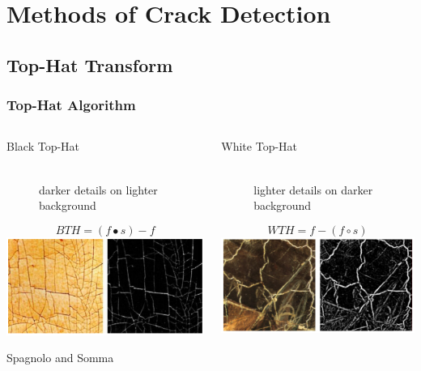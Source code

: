 \documentclass{beamer}
\begin{document}
\section[Methods of Crack Detection]{Methods of Crack Detection}

\subsection[Top-Hat Transform]{Top-Hat Transform}

\begin{frame}
\frametitle{Top-Hat Algorithm}
\begin{columns}
\begin{column}{0.5\textwidth}
\begin{description}
\item[Black Top-Hat] \hfill \\ darker details on lighter background
\end{description}
\begin{equation*}
BTH = (f \bullet s) - f
\end{equation*}
\includegraphics[width=1\textwidth]{black_top_hat}
\begin{center}
\tiny Spagnolo and Somma
\end{center}
\end{column}
\begin{column}{0.5\textwidth}
\begin{description}
\item[White Top-Hat] \hfill \\ lighter details on darker background
\end{description}
\begin{equation*}
WTH = f - (f \circ s)
\end{equation*}
\includegraphics[width=1\textwidth]{white_top_hat}

\end{column}
\end{columns}
\end{frame}
\end{document}
